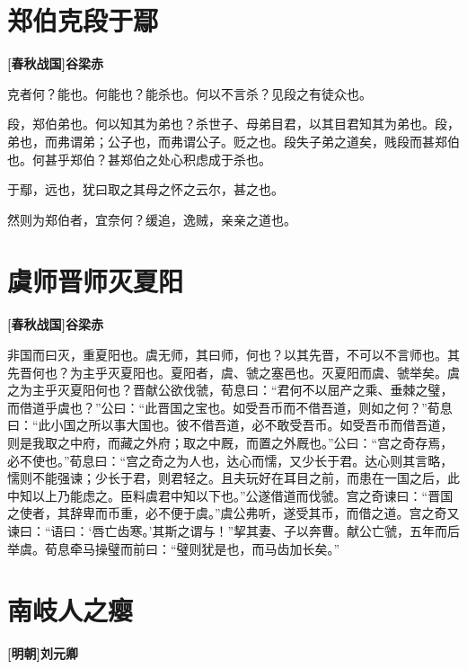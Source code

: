\documentclass[UTF8,titlepage,oneside]{ctexbook}
\begin{document}
\chapter*{郑伯克段于鄢}
\begin{center}
	\textbf{[春秋战国]谷梁赤}
\end{center}

克者何？能也。何能也？能杀也。何以不言杀？见段之有徒众也。

段，郑伯弟也。何以知其为弟也？杀世子、母弟目君，以其目君知其为弟也。段，弟也，而弗谓弟；公子也，而弗谓公子。贬之也。段失子弟之道矣，贱段而甚郑伯也。何甚乎郑伯？甚郑伯之处心积虑成于杀也。

于鄢，远也，犹曰取之其母之怀之云尔，甚之也。

然则为郑伯者，宜奈何？缓追，逸贼，亲亲之道也。


\chapter*{虞师晋师灭夏阳}
\begin{center}
	\textbf{[春秋战国]谷梁赤}
\end{center}

非国而曰灭，重夏阳也。虞无师，其曰师，何也？以其先晋，不可以不言师也。其先晋何也？为主乎灭夏阳也。夏阳者，虞、虢之塞邑也。灭夏阳而虞、虢举矣。虞之为主乎灭夏阳何也？晋献公欲伐虢，荀息曰：“君何不以屈产之乘、垂棘之璧，而借道乎虞也？”公曰：“此晋国之宝也。如受吾币而不借吾道，则如之何？”荀息曰：“此小国之所以事大国也。彼不借吾道，必不敢受吾币。如受吾币而借吾道，则是我取之中府，而藏之外府；取之中厩，而置之外厩也。”公曰：“宫之奇存焉，必不使也。”荀息曰：“宫之奇之为人也，达心而懦，又少长于君。达心则其言略，懦则不能强谏；少长于君，则君轻之。且夫玩好在耳目之前，而患在一国之后，此中知以上乃能虑之。臣料虞君中知以下也。”公遂借道而伐虢。宫之奇谏曰：“晋国之使者，其辞卑而币重，必不便于虞。”虞公弗听，遂受其币，而借之道。宫之奇又谏曰：“语曰：‘唇亡齿寒。’其斯之谓与！”挈其妻、子以奔曹。献公亡虢，五年而后举虞。荀息牵马操璧而前曰：“璧则犹是也，而马齿加长矣。”


\chapter*{南岐人之瘿}
\begin{center}
	\textbf{[明朝]刘元卿}
\end{center}
\end{document}
